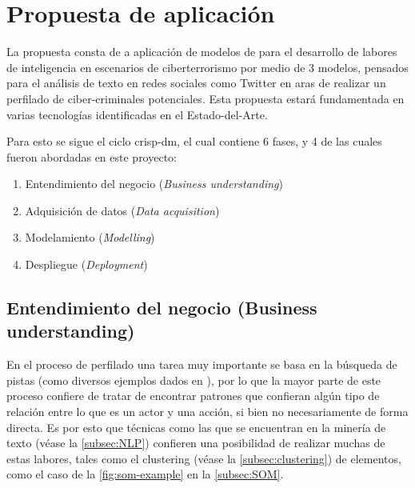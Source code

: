 
\chapter{Propuesta de aplicación} %

\label{chap:proposal} %


\newcommand{\nmodels}{{3 }}

La propuesta consta de a aplicación de modelos de  para el desarrollo de labores de inteligencia en escenarios de ciberterrorismo por medio de \nmodels modelos, pensados para el análisis de texto en redes sociales como Twitter en aras de realizar un perfilado de ciber-criminales potenciales. Esta propuesta estará fundamentada en varias tecnologías identificadas en el \mbox{Estado-del-Arte}.

Para esto se sigue el ciclo \gls{crisp-dm}, el cual contiene 6 fases, y 4 de las cuales fueron abordadas en este proyecto: 
\begin{enumerate}
\item Entendimiento del negocio (\textsl{Business understanding})
\item Adquisición de datos (\textsl{Data acquisition})
\item Modelamiento (\textsl{Modelling})
\item Despliegue (\textsl{Deployment})
\end{enumerate}

\section{Entendimiento del negocio (Business understanding)}
En el proceso de perfilado una tarea muy importante se basa en la búsqueda de pistas (como diversos ejemplos dados en \cite{mena2003investigative}), por lo que la mayor parte de este proceso confiere de tratar de encontrar patrones que confieran algún tipo de relación entre lo que es un actor y una acción, si bien no necesariamente de forma directa. Es por esto que técnicas como las que se encuentran en la minería de texto (véase la \cref{subsec:NLP}) confieren una posibilidad de realizar muchas de estas labores, tales como el \gls{clustering} (véase la \cref{subsec:clustering}) de elementos, como el caso de la \cref{fig:som-example} en la \cref{subsec:SOM}.


